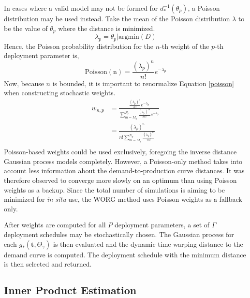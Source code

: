 In cases where a valid model may not be formed for $d_*^{-1}(\theta_p)$, 
a Poisson distribution may be used instead.  Take the mean of the Poisson
distribution $\lambda$ to be the value of $\theta_p$ where the distance
is minimized.
\begin{equation}
\label{lambda}
\lambda_p = \theta_p | \mathrm{argmin}(D) 
\end{equation}
Hence, the Poisson probability distribution for the $n$-th weight of the
$p$-th deployment parameter is, 
\begin{equation}
\label{poisson}
\mathrm{Poisson(n)} = \frac{(\lambda_p)^n}{n!} e^{-\lambda_p}
\end{equation}
Now, because $n$ is bounded, it is important to renormalize Equation 
\ref{poisson} when constructing stochastic weights.
\begin{equation}
\label{poisson-w}
\begin{split}
w_{n,p} & = \frac{\frac{(\lambda_p)^n}{n!} e^{-\lambda_p}}
                 {\sum_{m=M_p}^{N_p} \frac{(\lambda_p)^m}{m!} e^{-\lambda_p}}\\
        & = \frac{(\lambda_p)^n}
                 {n!\sum_{m=M_p}^{N_p} \frac{(\lambda_p)^m}{m!}}\\
\end{split}
\end{equation}
Poisson-based weights could be used exclusively, foregoing the inverse 
distance Gaussian process models completely. However, a Poisson-only 
method takes into account less information about the demand-to-production
curve distances. It was therefore observed to converge more slowly 
on an optimum than using Poisson weights as a backup.  Since the total 
number of simulations is aiming to be minimized for \emph{in situ} use, 
the WORG method uses Poisson weights as a fallback only.

After weights are computed for all $P$ deployment parameters, a set of 
$\Gamma$ deployment schedules may be stochastically chosen. The Gaussian
process for each $g_*(\mathbf{t}, \Theta_\gamma)$ is then evaluated and the
dynamic time warping distance to the demand curve is computed. The 
deployment schedule with the minimum distance is then selected and returned.



\subsection{Inner Product Estimation}
\label{inner-prod}

